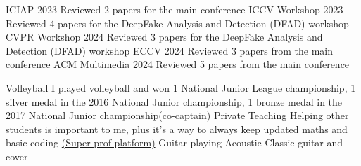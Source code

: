 \begin{cvskills}
\cvskill
    {ICIAP 2023} %
    {Reviewed 2 papers for the main conference} %
\cvskill
    {ICCV Workshop 2023} %
    {Reviewed 4 papers for the DeepFake Analysis and Detection (DFAD) workshop } %
\cvskill
    {CVPR Workshop 2024} %
    {Reviewed 3 papers for the DeepFake Analysis and Detection (DFAD) workshop } %
\cvskill
    {ECCV 2024} %
    {Reviewed 3 papers from the main conference} %
\cvskill
    {ACM Multimedia 2024} %
    {Reviewed 5 papers from the main conference} %

\end{cvskills}



\begin{cvskills}
\cvskill
    {Volleyball} %
    {I played volleyball and won 1 National Junior League championship, 1 silver medal in the 2016 National Junior championship, 1 bronze medal in the 2017 National Junior championship(co-captain)} %
\cvskill
    {Private Teaching} %
    {Helping other students is important to me, plus it's a way to always keep updated maths and basic coding \href{https://www.superprof.it/laureato-triennale-ingegneria-informatica-perito-informatico-offro-approccio-sia-tecnico-che-pratico-alle-materie.html}{(Super prof platform)}} %
\cvskill
    {Guitar playing} %
    {Acoustic-Classic guitar and cover} %

\end{cvskills}
